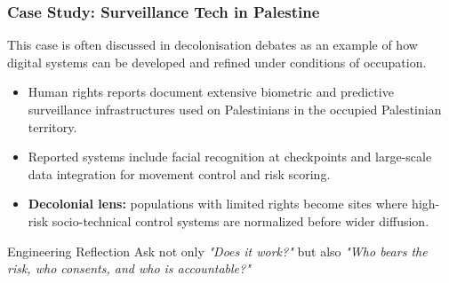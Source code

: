 \documentclass[xcolor=table]{beamer}
\begin{document}
\begin{frame}
    \frametitle{Case Study: Surveillance Tech in Palestine}
    \footnotesize
    This case is often discussed in decolonisation debates as an example of how digital systems can be developed and refined under conditions of occupation.

    \vspace{0.2cm}
    \begin{itemize}
        \item Human rights reports document extensive biometric and predictive surveillance infrastructures used on Palestinians in the occupied Palestinian territory.
        \item Reported systems include facial recognition at checkpoints and large-scale data integration for movement control and risk scoring.
        \item \textbf{Decolonial lens:} populations with limited rights become sites where high-risk socio-technical control systems are normalized before wider diffusion.
    \end{itemize}

    \vspace{0.2cm}
    \begin{alertblock}{Engineering Reflection}
        Ask not only \textit{"Does it work?"} but also \textit{"Who bears the risk, who consents, and who is accountable?"}
    \end{alertblock}
\end{frame}
\end{document}
